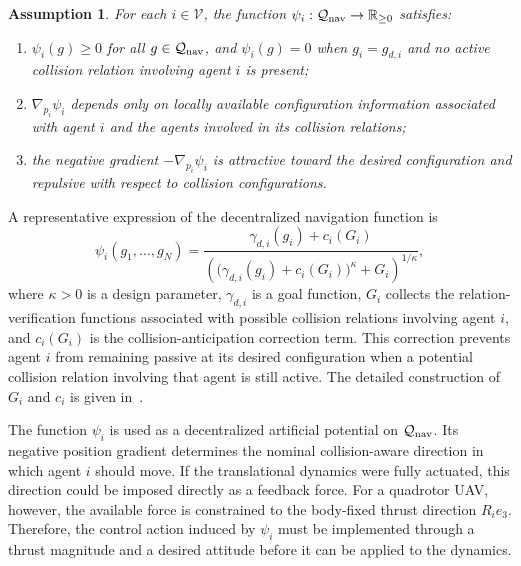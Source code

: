 \documentclass[journal,twoside,web]{ieeecolor}
\newtheorem{assumption}[theorem]{Assumption}
\begin{document}
\begin{assumption}
\label{ass:navigation_function}
For each $i\in\mathcal V$, the function
$\psi_i:\mathcal Q_{\rm nav}\rightarrow\mathbb R_{\geq0}$
satisfies:
\begin{enumerate}
    \item $\psi_i(g)\geq0$ for all $g\in\mathcal Q_{\rm nav}$,
    and $\psi_i(g)=0$ when $g_i=g_{d,i}$ and no active collision
relation involving agent $i$ is present;

    \item $\nabla_{p_i}\psi_i$ depends only on locally available
    configuration information associated with agent $i$ and
    the agents involved in its collision relations;

    \item the negative gradient $-\nabla_{p_i}\psi_i$ is
    attractive toward the desired configuration and repulsive
    with respect to collision configurations.
\end{enumerate}
\end{assumption}

A representative expression of the decentralized navigation
function is
\begin{equation}
    \psi_i(g_1,\ldots,g_N)
    =
    \frac{
        \gamma_{d,i}(g_i)+c_i(G_i)
    }{
        \left(
            \big(\gamma_{d,i}(g_i)+c_i(G_i)\big)^\kappa
            +
            G_i
        \right)^{1/\kappa}
    },
    \label{eq:decentralized_navigation_function}
\end{equation}
where $\kappa>0$ is a design parameter, $\gamma_{d,i}$ is a
goal function, $G_i$ collects the relation-verification
functions associated with possible collision relations involving
agent $i$, and $c_i(G_i)$ is the collision-anticipation
correction term. This correction prevents agent $i$ from
remaining passive at its desired configuration when a potential
collision relation involving that agent is still active. The
detailed construction of $G_i$ and $c_i$ is given
in~\cite{YagoNietoSimoesGiribetColombo2026DNFSE3Learning}.

The function $\psi_i$ is used as a decentralized artificial
potential on $\mathcal Q_{\rm nav}$. Its negative position
gradient determines the nominal collision-aware direction in
which agent $i$ should move. If the translational dynamics
were fully actuated, this direction could be imposed directly
as a feedback force. For a quadrotor UAV, however, the
available force is constrained to the body-fixed thrust
direction $R_ie_3$. Therefore, the control action induced by
$\psi_i$ must be implemented through a thrust magnitude and
a desired attitude before it can be applied to the dynamics.
\end{document}
